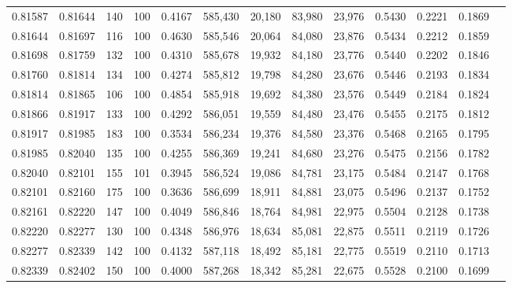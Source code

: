 \begin{tabular}{rrrrrrrrrrrrr}
0.81587 & 0.81644 &   140 & 100 &                                     0.4167 & 585,430 &  20,180 &  83,980 &  23,976 & 0.5430 & 0.2221 & 0.1869 \\
0.81644 & 0.81697 &   116 & 100 &                                     0.4630 & 585,546 &  20,064 &  84,080 &  23,876 & 0.5434 & 0.2212 & 0.1859 \\
0.81698 & 0.81759 &   132 & 100 &                                     0.4310 & 585,678 &  19,932 &  84,180 &  23,776 & 0.5440 & 0.2202 & 0.1846 \\
0.81760 & 0.81814 &   134 & 100 &                                     0.4274 & 585,812 &  19,798 &  84,280 &  23,676 & 0.5446 & 0.2193 & 0.1834 \\
0.81814 & 0.81865 &   106 & 100 &                                     0.4854 & 585,918 &  19,692 &  84,380 &  23,576 & 0.5449 & 0.2184 & 0.1824 \\
0.81866 & 0.81917 &   133 & 100 &                                     0.4292 & 586,051 &  19,559 &  84,480 &  23,476 & 0.5455 & 0.2175 & 0.1812 \\
0.81917 & 0.81985 &   183 & 100 &                                     0.3534 & 586,234 &  19,376 &  84,580 &  23,376 & 0.5468 & 0.2165 & 0.1795 \\
0.81985 & 0.82040 &   135 & 100 &                                     0.4255 & 586,369 &  19,241 &  84,680 &  23,276 & 0.5475 & 0.2156 & 0.1782 \\
0.82040 & 0.82101 &   155 & 101 &                                     0.3945 & 586,524 &  19,086 &  84,781 &  23,175 & 0.5484 & 0.2147 & 0.1768 \\
0.82101 & 0.82160 &   175 & 100 &                                     0.3636 & 586,699 &  18,911 &  84,881 &  23,075 & 0.5496 & 0.2137 & 0.1752 \\
0.82161 & 0.82220 &   147 & 100 &                                     0.4049 & 586,846 &  18,764 &  84,981 &  22,975 & 0.5504 & 0.2128 & 0.1738 \\
0.82220 & 0.82277 &   130 & 100 &                                     0.4348 & 586,976 &  18,634 &  85,081 &  22,875 & 0.5511 & 0.2119 & 0.1726 \\
0.82277 & 0.82339 &   142 & 100 &                                     0.4132 & 587,118 &  18,492 &  85,181 &  22,775 & 0.5519 & 0.2110 & 0.1713 \\
0.82339 & 0.82402 &   150 & 100 &                                     0.4000 & 587,268 &  18,342 &  85,281 &  22,675 & 0.5528 & 0.2100 & 0.1699 \\

\end{tabular}
